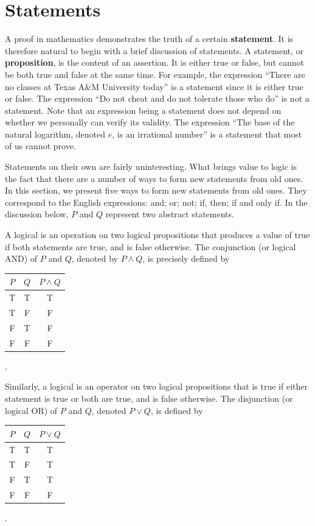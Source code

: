 \section{Statements}

A proof in mathematics demonstrates the truth of a certain \textbf{statement}.
It is therefore natural to begin with a brief discussion of statements.
A statement, or \textbf{proposition}, is the content of an assertion.
It is either true or false, but cannot be both true and false at the same time.
For example, the expression ``There are no classes at Texas A\&M University today'' is a statement since it is either true or false.
The expression ``Do not cheat and do not tolerate those who do'' is not a statement.
Note that an expression being a statement does not depend on whether we personally can verify its validity.
The expression ``The base of the natural logarithm, denoted $e$, is an irrational number'' is a statement that most of us cannot prove.

Statements on their own are fairly uninteresting.
What brings value to logic is the fact that there are a number of ways to form new statements from old ones.
In this section, we present five ways to form new statements from old ones.
They correspond to the English expressions: and; or; not; if, then; if and only if.
In the discussion below, $P$ and $Q$ represent two abstract statements.

A logical  is an operation on two logical propositions that produces a value of true if both statements are true, and is false otherwise.
The conjunction (or logical AND) of $P$ and $Q$, denoted by $P \wedge Q$, is precisely defined by
\begin{center}
\begin{tabular}{|c|c|c|}
\hline
$P$ & $Q$ & $P \wedge Q$ \tabularnewline
\hline
T & T & T \tabularnewline
T & F & F \tabularnewline
F & T & F \tabularnewline
F & F & F \tabularnewline
\hline
\end{tabular} .
\end{center}

Similarly, a logical  is an operator on two logical propositions that is true if either statement is true or both are true, and is false otherwise.
The disjunction (or logical OR) of $P$ and $Q$, denoted $P \vee Q$, is defined by
\begin{center}
\begin{tabular}{|c|c|c|}
\hline
$P$ & $Q$ & $P \vee Q$ \tabularnewline
\hline
T & T & T \tabularnewline
T & F & T \tabularnewline
F & T & T \tabularnewline
F & F & F \tabularnewline
\hline
\end{tabular} .
\end{center}

